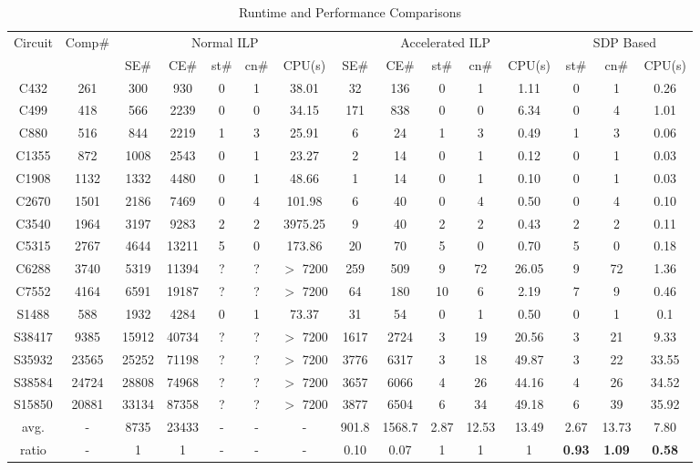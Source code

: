 \documentclass[10pt,conference]{IEEEtran}
\begin{document}
\begin{table*}[tb]
\centering
\caption{Runtime and Performance Comparisons }
\label{tab:result1}
\begin{tabular}{|c|c|c|c|c|c|c|c|c|c|c|c|c|c|c|}
	\hline \hline
	Circuit	& Comp\#	& \multicolumn{5}{|c}{Normal ILP}				& \multicolumn{5}{|c|}{Accelerated ILP}	& \multicolumn{3}{|c|}{SDP Based}\\
	\cline{3-15}
			&			& SE\#	&CE\#	& st\#	& cn\#	& CPU(s)		& SE\#	&CE\#	& st\#	& cn\#& CPU(s)	& st\#& cn\#& CPU(s)\\
	\hline
	C432	& 261	& 300&930	& 0	& 1	& 38.01		& 32&136		& 0	& 1	& 1.11		&0&1& 0.26\\
	C499	& 418	& 566&2239	& 0	& 0	& 34.15		& 171&838	& 0	& 0	& 6.34		&0&4& 1.01\\
	C880	& 516	& 844&2219	& 1	& 3	& 25.91		& 6&24		& 1	& 3	& 0.49		&1&3& 0.06\\
	C1355	& 872	& 1008&2543	& 0	& 1	& 23.27		& 2&14		& 0	& 1	& 0.12		&0&1& 0.03\\
	C1908	& 1132	& 1332&4480	& 0	& 1	& 48.66		& 1&14		& 0	& 1	& 0.10		&0&1& 0.03\\
	C2670	& 1501	& 2186&7469	& 0	& 4	& 101.98		& 6&40		& 0	& 4	& 0.50		&0&4& 0.10\\
	C3540	& 1964	& 3197&9283	& 2	& 2	& 3975.25		& 9&40		& 2	& 2	& 0.43		&2&2& 0.11\\
	C5315	& 2767	& 4644&13211	& 5	& 0	& 173.86		& 20&70		& 5	& 0	& 0.70		&5&0& 0.18\\
	C6288	& 3740	& 5319&11394	& ?	& ?	& $>$ 7200	& 259&509	& 9	& 72	& 26.05		&9&72&1.36\\
	C7552	& 4164	& 6591&19187	& ?	& ?	& $>$ 7200	& 64&180		& 10	& 6	& 2.19		&7&9&0.46\\
	S1488	& 588	& 1932&4284	& 0	& 1	& 73.37		& 31&54		& 0	& 1	& 0.50		&0&1& 0.1\\
	S38417	& 9385	&15912&40734	& ?	& ?	& $>$ 7200	& 1617&2724	& 3	& 19	& 20.56		&3&21& 9.33\\
	S35932	& 23565	&25252&71198	& ?	& ?	& $>$ 7200	& 3776&6317	& 3	& 18	& 49.87		&3&22&33.55\\
	S38584	& 24724	&28808&74968	& ?	& ?	& $>$ 7200	& 3657&6066	& 4	& 26	& 44.16		&4&26&34.52\\
	S15850	& 20881	&33134&87358	& ?	& ?	& $>$ 7200	& 3877&6504	& 6	& 34	& 49.18		&6&39&35.92\\
	\hline
	avg.		& -		& 8735&23433	& -	& -			& -	&901.8&1568.7	&2.87&12.53&13.49		&2.67&13.73&7.80\\
	ratio		& -		& 1	& 1	& -	& -	& -			& 0.10&0.07	 & 1&1	    & 1		&\textbf{0.93}&\textbf{1.09}&\textbf{0.58}\\
	\hline \hline
\end{tabular}
\end{table*}
\end{document}
